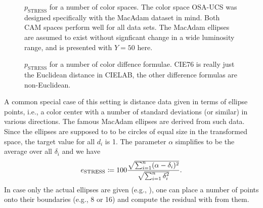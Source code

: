 \documentclass{scrartcl}
\theoremstyle{named}
\begin{document}
\begin{figure}
\centering

\caption{$p_\text{STRESS}$ for a number of color spaces. The color space OSA-UCS was
designed specifically with the MacAdam \cite{macadam1974} dataset in mind. Both CAM
spaces perform well for all data sets. The MacAdam ellipses are assumed to exist without
  signficant change in a wide luminosity range, and is presented with $Y=50$ here.}
\end{figure}

\begin{figure}
\centering
  
  \caption{$p_\text{STRESS}$ for a number of color diffence formulae.
  CIE76 is really just the Euclidean distance in CIELAB, the other difference formulas
  are non-Euclidean.}
\end{figure}

A common special case of this setting is distance data given in terms of ellipse points,
i.e., a color center with a number of standard deviations (or similar) in various
directions. The famous MacAdam ellipses \cite{macadam1942} are derived from such data.
Since the ellipses are supposed to to be circles of equal size in the transformed space,
the target value for all $d_i$ is 1. The parameter $\alpha$ simplifies to be the average
over all $\delta_i$ and we have
\begin{equation}\label{eq:e}
  e_{\text{STRESS}}
  \coloneqq
  100
  \frac{%
    \sqrt{\sum_{i=1}^n (\alpha - \delta_{i})^2}
  }{
    \sqrt{\sum_{i=1}^n \delta_i^2}
  }.
\end{equation}
In case only the actual ellipses are given (e.g., \cite{luorigg}), one can place a
number of points onto their boundaries (e.g., 8 or 16) and compute the residual with
from them.
\end{document}
